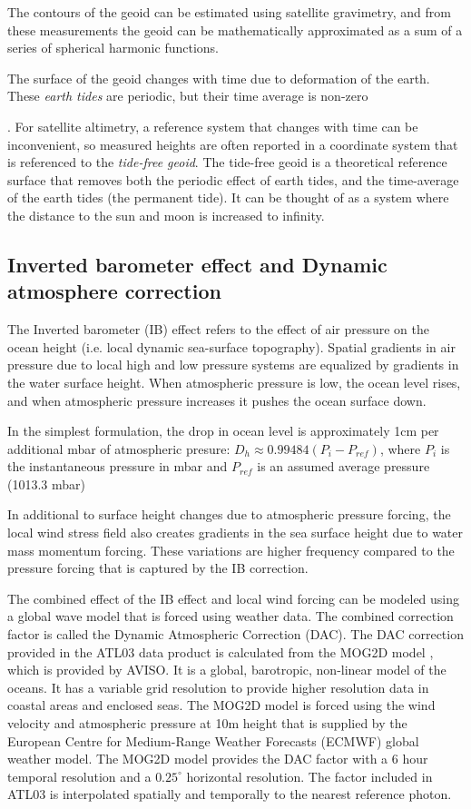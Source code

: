 The contours of the geoid can be estimated using satellite gravimetry, and from these measurements the geoid can be mathematically approximated as a sum of a series of spherical harmonic functions.

The surface of the geoid changes with time due to deformation of the earth. These \emph{earth tides} are periodic, but their time average is non-zero



. For satellite altimetry, a reference system that changes with time can be inconvenient, so measured heights are often reported in a coordinate system that is referenced to the \emph{tide-free geoid}. The tide-free geoid is a theoretical reference surface that removes both the periodic effect of earth tides, and the time-average of the earth tides (the permanent tide). It can be thought of as a system where the distance to the sun and moon is increased to infinity.

\subsection{Inverted barometer effect and Dynamic atmosphere correction}
The Inverted barometer (IB) effect refers to the effect of air pressure on the ocean height (i.e. local dynamic sea-surface topography)\parencite{Robbins2022}. Spatial gradients in air pressure due to local high and low pressure systems are equalized by gradients in the water surface height. When atmospheric pressure is low, the ocean level rises, and when atmospheric pressure increases it pushes the ocean surface down. 

In the simplest formulation, the drop in ocean level is approximately 1cm per additional mbar of atmospheric presure: $D_h \approx 0.99484(P_i-P_{ref})$, where $P_i$ is the instantaneous pressure in mbar and $P_{ref}$ is an assumed average pressure (1013.3 mbar)

In additional to surface height changes due to atmospheric pressure forcing, the local wind stress field also creates gradients in the sea surface height due to water mass momentum forcing. These variations are higher frequency compared to the pressure forcing that is captured by the IB correction.

The combined effect of the IB effect and local wind forcing can be modeled using a global wave model that is forced using weather data. The combined correction factor is called the Dynamic Atmospheric Correction (DAC). The DAC correction provided in the ATL03 data product is calculated from the MOG2D model \parencite{LeProvost1994}, which is provided by AVISO. It is a global, barotropic, non-linear model of the oceans. It has a variable grid resolution to provide higher resolution data in coastal areas and enclosed seas. The MOG2D model is forced using the wind velocity and atmospheric pressure at 10m height that is supplied by the European Centre for Medium-Range Weather Forecasts (ECMWF) global weather model. The MOG2D model provides the DAC factor with a 6 hour temporal resolution and a $0.25^{\circ}$ horizontal resolution.
The factor included in ATL03 is interpolated spatially and temporally to the nearest reference photon.

